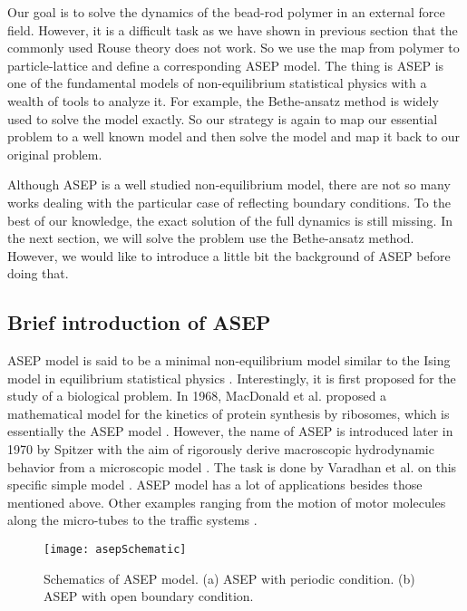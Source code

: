 Our goal is to solve the dynamics of the bead-rod polymer in an external force field. However, it is a difficult task as we have shown in previous section that the commonly used Rouse theory does not work. So we use the map from polymer to particle-lattice and define a corresponding ASEP model. The thing is ASEP is one of the fundamental models of non-equilibrium statistical physics with a wealth of tools to analyze it. For example, the Bethe-ansatz method is widely used to solve the model exactly. So our strategy is again to map our essential problem to a well known model and then solve the model and map it back to our original problem. 

Although ASEP is a well studied non-equilibrium model, there are not so many works dealing with the particular case of reflecting boundary conditions. To the best of our knowledge, the exact solution of the full dynamics is still missing. In the next section, we will solve the problem use the Bethe-ansatz method. However, we would like to introduce a little bit the background of ASEP before doing that. 


\subsection{Brief introduction of ASEP}
\label{sub:brief_introduction_of_asep}

ASEP model is said to be a minimal non-equilibrium model similar to the Ising model in equilibrium statistical physics \cite{Derrida1998, Mallick2011b}. Interestingly, it is first proposed for the study of a biological problem. In 1968, MacDonald et al. proposed a mathematical model for the kinetics of protein synthesis by ribosomes, which is essentially the ASEP model \cite{Macdonald1968}. However, the name of ASEP is introduced later in 1970 by Spitzer with the aim of rigorously derive macroscopic hydrodynamic behavior from a microscopic model \cite{Spitzer1970}. The task is done by Varadhan et al. on this specific simple model \cite{hsu1999}. ASEP model has a lot of applications besides those mentioned above. Other examples ranging from the motion of motor molecules along the micro-tubes to the traffic systems \cite{Bressloff2013, schadschneider2010}. 

\begin{figure}[htpb]
    \centering
    \texttt{[image: asepSchematic]}
    \caption{Schematics of ASEP model. (a) ASEP with periodic condition. (b) ASEP with open boundary condition.}
    \label{fig:asepSchematic}
\end{figure}

